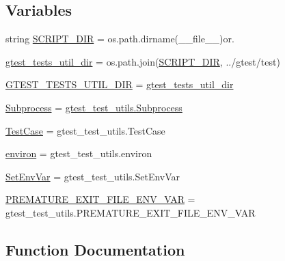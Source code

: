 \subsection*{Variables}
\begin{DoxyCompactItemize}
\item 
string \hyperlink{namespacegmock__test__utils_a4ef94affd9d889f78d67be80017eeddd}{S\+C\+R\+I\+P\+T\+\_\+\+D\+IR} = os.\+path.\+dirname(\+\_\+\+\_\+file\+\_\+\+\_\+)or\textquotesingle{}.\textquotesingle{}
\item 
\hyperlink{namespacegmock__test__utils_af6d94170502149e7f99cfa73ddc13c00}{gtest\+\_\+tests\+\_\+util\+\_\+dir} = os.\+path.\+join(\hyperlink{namespacegmock__test__utils_a4ef94affd9d889f78d67be80017eeddd}{S\+C\+R\+I\+P\+T\+\_\+\+D\+IR}, \textquotesingle{}../gtest/test\textquotesingle{})
\item 
\hyperlink{namespacegmock__test__utils_ae7ee9324ba489b3cbd99c5e26006eba9}{G\+T\+E\+S\+T\+\_\+\+T\+E\+S\+T\+S\+\_\+\+U\+T\+I\+L\+\_\+\+D\+IR} = \hyperlink{namespacegmock__test__utils_af6d94170502149e7f99cfa73ddc13c00}{gtest\+\_\+tests\+\_\+util\+\_\+dir}
\item 
\hyperlink{namespacegmock__test__utils_a31a0e33565ec805d314cb0a4eb8317e6}{Subprocess} = \hyperlink{classgtest__test__utils_1_1Subprocess}{gtest\+\_\+test\+\_\+utils.\+Subprocess}
\item 
\hyperlink{namespacegmock__test__utils_a959c5af591e4d49b6d35745205b64509}{Test\+Case} = gtest\+\_\+test\+\_\+utils.\+Test\+Case
\item 
\hyperlink{namespacegmock__test__utils_a6f0938b5e8839ebc847b52a38f4d35e3}{environ} = gtest\+\_\+test\+\_\+utils.\+environ
\item 
\hyperlink{namespacegmock__test__utils_ab0c69f8ce649fdd5a17f99deedf3eb29}{Set\+Env\+Var} = gtest\+\_\+test\+\_\+utils.\+Set\+Env\+Var
\item 
\hyperlink{namespacegmock__test__utils_a9392c288e6da3024d65ec0bddc0d86c3}{P\+R\+E\+M\+A\+T\+U\+R\+E\+\_\+\+E\+X\+I\+T\+\_\+\+F\+I\+L\+E\+\_\+\+E\+N\+V\+\_\+\+V\+AR} = gtest\+\_\+test\+\_\+utils.\+P\+R\+E\+M\+A\+T\+U\+R\+E\+\_\+\+E\+X\+I\+T\+\_\+\+F\+I\+L\+E\+\_\+\+E\+N\+V\+\_\+\+V\+AR
\end{DoxyCompactItemize}


\subsection{Function Documentation}
